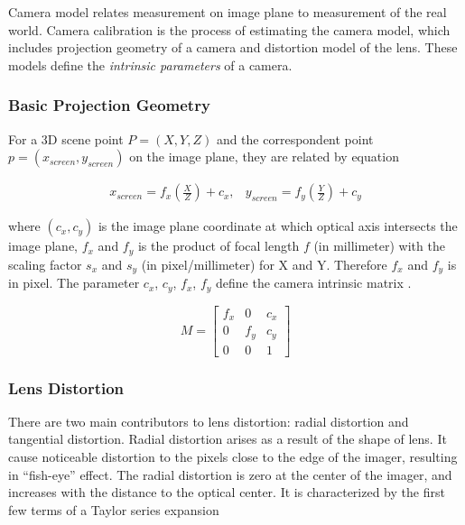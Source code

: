 Camera model relates measurement on image plane to measurement of the
real world. Camera calibration is the process of estimating the camera
model, which includes projection geometry of a camera and distortion
model of the lens. These models define the \textit{intrinsic
  parameters} of a camera.

\subsubsection{Basic Projection Geometry}
For a 3D scene point $P=(X, Y, Z)$ and the correspondent point
$p=(x_{screen}, y_{screen})$ on the image plane, they are related by
equation \cite{bradski_learning_2008}

\begin{equation}
\begin{matrix}
x_{screen} = f_x\left(\frac{X}{Z}\right)+c_x, &
y_{screen}=f_y\left(\frac{Y}{Z}\right)+c_y
\end{matrix}
\end{equation}

\noindent where $(c_x, c_y)$ is the image plane coordinate at which
optical axis intersects the image plane, $f_x$ and $f_y$ is the
product of focal length $f$ (in millimeter) with the scaling factor
$s_x$ and $s_y$ (in pixel/millimeter) for X and Y. Therefore $f_x$ and
$f_y$ is in pixel. The parameter $c_x$, $c_y$, $f_x$, $f_y$ define the
camera intrinsic matrix \cite{bradski_learning_2008}
\cite{heikkila_four-step_1997}.

\begin{equation}
M = \begin{bmatrix}
f_x & 0 & c_x \\
0& f_y & c_y \\
0 & 0 & 1 \end{bmatrix}
\end{equation}

\subsubsection{Lens Distortion}
There are two main contributors to lens distortion: radial distortion
and tangential distortion. Radial distortion arises as a result of the
shape of lens. It cause noticeable distortion to the pixels close to
the edge of the imager, resulting in ``fish-eye'' effect. The radial
distortion is zero at the center of the imager, and increases with the
distance to the optical center. It is characterized by the first few
terms of a Taylor series expansion \cite{bradski_learning_2008}

